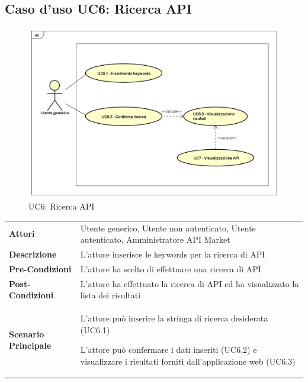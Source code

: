 \newpage
\subsection{Caso d'uso UC6: Ricerca API}
\label{UC6}
\begin{figure}[ht]
	\centering
	\includegraphics[scale=0.45]{UML/UC6.png}
	\caption{UC6: Ricerca API}
\end{figure}

\begin{longtable}{ l | p{11cm}}
	\hline
	\rowcolor{Gray}
	 \multicolumn{2}{c}{UC6 - Ricerca API} \\
	 \hline
	\textbf{Attori} & Utente generico, Utente non autenticato, Utente autenticato, Amministratore API Market \\
	\textbf{Descrizione} & L'attore inserisce le keywords per la ricerca di API \\
	\textbf{Pre-Condizioni} & L'attore ha scelto di effettuare una ricerca di API \\
	\textbf{Post-Condizioni} & L'attore ha effettuato la ricerca di API ed ha visualizzato la lista dei risultati \\
	\textbf{Scenario Principale} & 
	\begin{enumerate*}[label=(\arabic*.),itemjoin={\newline}]
		\item L'attore può inserire la stringa di ricerca desiderata (UC6.1)
		\item L'attore può confermare i dati inseriti (UC6.2) e visualizzare i risultati forniti dall'applicazione web (UC6.3)
	\end{enumerate*}\\
\end{longtable}

